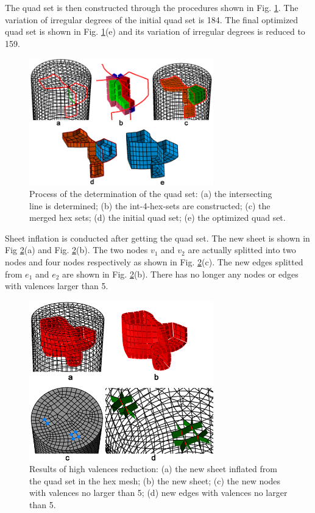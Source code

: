 \documentclass[final,5p,times,twocolumn]{elsarticle}
\begin{document}
The quad set is then constructed through the procedures shown in Fig. \ref{fig:exam2_quad_set}. The variation of irregular degrees of the initial quad set is 184. The final optimized quad set is shown in Fig. \ref{fig:exam2_quad_set}(e) and its variation of irregular degrees is reduced to 159.

\begin{figure}[htbp]
\begin{center}
\includegraphics[width=8cm]{exam2_quad_set.png}
\caption{Process of the determination of the quad set: (a) the intersecting line is determined; (b) the int-4-hex-sets are constructed; (c) the merged hex sets; (d) the initial quad set; (e) the optimized quad set.}
\label{fig:exam2_quad_set}
\end{center}
\end{figure}

Sheet inflation is conducted after getting the quad set. The new sheet is shown in Fig \ref{fig:exam2_sheet}(a) and Fig. \ref{fig:exam2_sheet}(b). The two nodes $v_1$ and $v_2$ are actually splitted into two nodes and four nodes respectively as shown in Fig. \ref{fig:exam2_sheet}(c). The new edges splitted from $e_1$ and $e_2$ are shown in Fig. \ref{fig:exam2_sheet}(b). There has no longer any nodes or edges with valences larger than 5.

\begin{figure}[htbp]
\begin{center}
\includegraphics[width=8cm]{exam2_sheet.png}
\caption{Results of high valences reduction: (a) the new sheet inflated from the quad set in the hex mesh; (b) the new sheet; (c) the new nodes with valences no larger than 5; (d) new edges with valences no larger than 5.}
\label{fig:exam2_sheet}
\end{center}
\end{figure}
\end{document}
